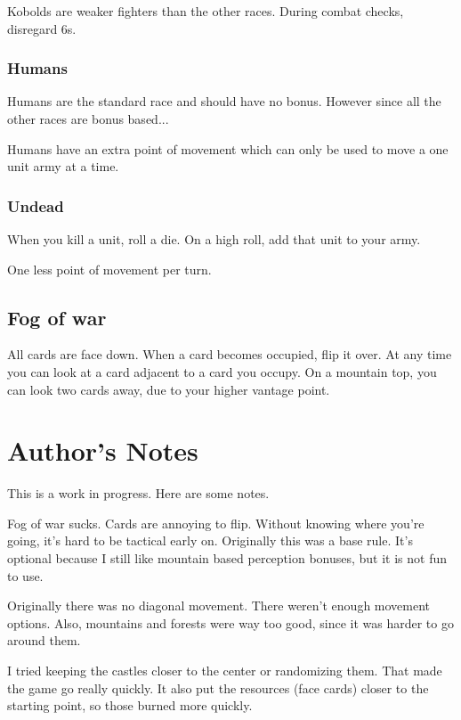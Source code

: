 \documentclass{article}
\begin{document}
Kobolds are weaker fighters than the other races.  During combat checks, disregard 6s.

\subsubsection{Humans}

Humans are the standard race and should have no bonus.  However since all the other races are bonus based...

Humans have an extra point of movement which can only be used to move a one unit army at a time.  

\subsubsection{Undead}

When you kill a unit, roll a die.  On a high roll, add that unit to your army.  

One less point of movement per turn.

\subsection{Fog of war}

All cards are face down.  When a card becomes occupied, flip it over.   At any time you can look at a card adjacent to a card you occupy.  On a mountain top, you can look two cards away, due to your higher vantage point.

\newpage
\section{Author's Notes}

This is a work in progress.  Here are some notes.

Fog of war sucks.  Cards are annoying to flip.  Without knowing where you're going, it's hard to be tactical early on.  Originally this was a base rule.  It's optional because I still like mountain based perception bonuses, but it is not fun to use.

Originally there was no diagonal movement.  There weren't enough movement options.  Also, mountains and forests were way too good, since it was harder to go around them.

I tried keeping the castles closer to the center or randomizing them.  That made the game go really quickly.  It also put the resources (face cards) closer to the starting point, so those burned more quickly.
\end{document}
